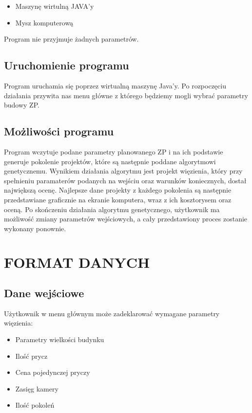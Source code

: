 \documentclass{article}
\begin{document}
\begin{itemize}
	\item Maszyn\k{e} wirtuln\k{a} JAVA'y\par

	\item Mysz komputerow\k{a}

\end{itemize}\par

Program nie przyjmuje \.zadnych parametr\'ow.

\subsection{Uruchomienie programu}

Program uruchamia si\k{e} poprzez wirtualn\k{a} maszyn\k{e} Java'y. Po rozpocz\k{e}ciu dzia\l{}ania przywita nas menu g\l{}\'owne z kt\'orego b\k{e}dziemy mogli wybra\'c parametry budowy ZP.

\subsection{Mo\.zliwo\'sci programu}

Program wczytuje podane parametry planowanego ZP i na ich podstawie generuje pokolenie projektów, które są następnie poddane algorytmowi genetycznemu. Wynikiem działania algorytmu jest projekt więzienia, który przy spełnieniu paramaterów podanych na wejściu oraz warunków koniecznych, dostał największą ocenę. Najlepsze dane projekty z każdego pokolenia są następnie przedstawiane graficznie na ekranie komputera, wraz z ich kosztorysem oraz oceną. Po skończeniu działania algorytmu genetycznego, użytkownik ma możliwość zmiany parametrów wejściowych, a cały przedstawiony proces zostanie wykonany ponownie.

\section{FORMAT DANYCH}

\subsection{Dane wej\'sciowe}
Użytkownik w menu głównym może zadeklarować wymagane parametry więzienia:

\begin{itemize}
	\item Parametry wielkości budynku\par

	\item Ilość prycz \par
	
	\item Cena pojedynczej pryczy \par
	
	\item Zasięg kamery \par
	
	\item Ilość pokoleń \par

\end{itemize}\par
\end{document}

